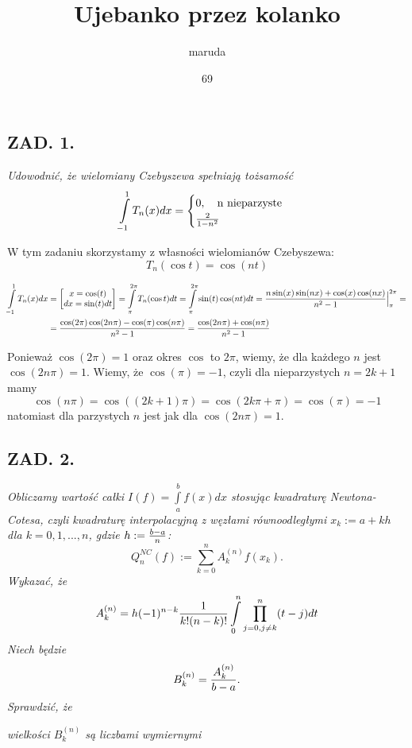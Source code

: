 \documentclass{article}[16pt]
\title{Ujebanko przez kolanko}
\date{69}
\author{maruda}
\begin{document}
\maketitle

\subsection*{ZAD. 1.}
\emph{Udowodnić, że wielomiany Czebyszewa spełniają tożsamość}
$$\int\limits_{-1}^1T_n(x)dx=\begin{cases}
    0,\quad \text{n nieparzyste}\\
    {2\over 1-n^2}
\end{cases}$$
\medskip

W tym zadaniu skorzystamy z własności wielomianów Czebyszewa:
$$T_n(\cos t)=\cos(nt)$$

\begin{align*}
    \int\limits_{-1}^1T_n(x)dx&=\begin{bmatrix}
        x=\cos(t)\\
        dx=\sin(t)dt
    \end{bmatrix}=\int\limits_{\pi}^{2\pi}T_n(\cos t)dt=\int\limits_\pi^{2\pi}\sin(t)\cos(nt)dt={n\sin(x)\sin(nx)+\cos(x)\cos(nx)\over n^2-1}\Big|_\pi^{2\pi}=\\
    &={\cos(2\pi)\cos(2n\pi)-\cos(\pi)\cos(n\pi)\over n^2-1}={\cos(2n\pi)+\cos(n\pi)\over n^2-1}
\end{align*}

Ponieważ $\cos(2\pi)=1$ oraz okres $\cos$ to $2\pi$, wiemy, że dla każdego $n$ jest $\cos(2n\pi)=1$. Wiemy, że $\cos(\pi)=-1$, czyli dla nieparzystych $n=2k+1$ mamy 
$$\cos(n\pi)=\cos((2k+1)\pi)=\cos(2k\pi+\pi)=\cos(\pi)=-1$$
natomiast dla parzystych $n$ jest jak dla $\cos(2n\pi)=1$.

\subsection*{ZAD. 2.}
\emph{Obliczamy wartość całki $I(f)=\int\limits_a^bf(x)dx$ stosując kwadraturę Newtona-Cotesa, czyli kwadraturę interpolacyjną z węzłami równoodległymi $x_k:=a+kh$ dla $k=0,1,...,n$, gdzie $h:={b-a\over n}$:}
$$Q_n^{NC}(f):=\sum\limits_{k=0}^nA_k^{(n)}f(x_k).$$
\emph{Wykazać, że}
$$A_k^{(n)}=h(-1)^{n-k}{1\over k!(n-k)!}\int\limits_0^n\prod\limits_{j=0,j\neq k}^n(t-j)dt$$
\emph{Niech będzie }
$$B_k^{(n)}={A_k^{(n)}\over b-a}.$$
\emph{Sprawdzić, że}
\smallskip

\point \emph{wielkości $B_k^{(n)}$ są liczbami wymiernymi}
\end{document}
